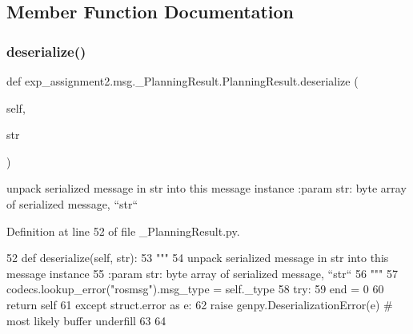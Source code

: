 \subsection{Member Function Documentation}
\mbox{\label{classexp__assignment2_1_1msg_1_1__PlanningResult_1_1PlanningResult_a1cabbb7ce774c8be38e3ac9c49ec76e2}} 
\subsubsection{\texorpdfstring{deserialize()}{deserialize()}}
{\footnotesize\ttfamily def exp\+\_\+assignment2.\+msg.\+\_\+\+Planning\+Result.\+Planning\+Result.\+deserialize (\begin{DoxyParamCaption}\item[{}]{self,  }\item[{}]{str }\end{DoxyParamCaption})}

\begin{DoxyVerb}unpack serialized message in str into this message instance
:param str: byte array of serialized message, ``str``
\end{DoxyVerb}
 

Definition at line 52 of file \+\_\+\+Planning\+Result.\+py.


\begin{DoxyCode}
52   \textcolor{keyword}{def }deserialize(self, str):
53     \textcolor{stringliteral}{"""}
54 \textcolor{stringliteral}{    unpack serialized message in str into this message instance}
55 \textcolor{stringliteral}{    :param str: byte array of serialized message, ``str``}
56 \textcolor{stringliteral}{    """}
57     codecs.lookup\_error(\textcolor{stringliteral}{"rosmsg"}).msg\_type = self.\_type
58     \textcolor{keywordflow}{try}:
59       end = 0
60       \textcolor{keywordflow}{return} self
61     \textcolor{keywordflow}{except} struct.error \textcolor{keyword}{as} e:
62       \textcolor{keywordflow}{raise} genpy.DeserializationError(e)  \textcolor{comment}{# most likely buffer underfill}
63 
64 
\end{DoxyCode}
\mbox{\label{classexp__assignment2_1_1msg_1_1__PlanningResult_1_1PlanningResult_abd91bb3a55358633027483832e19771d}} 
